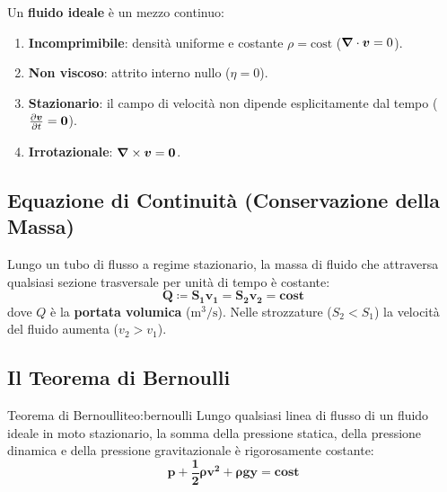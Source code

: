 Un \textbf{fluido ideale} è un mezzo continuo:
\begin{enumerate}
    \item \textbf{Incomprimibile}: densità uniforme e costante $\rho = \text{cost}$ ($\bm{\nabla}\cdot\bm{v} = 0$).
    \item \textbf{Non viscoso}: attrito interno nullo ($\eta = 0$).
    \item \textbf{Stazionario}: il campo di velocità non dipende esplicitamente dal tempo ($\frac{\partial \bm{v}}{\partial t} = \bm{0}$).
    \item \textbf{Irrotazionale}: $\bm{\nabla}\times\bm{v} = \bm{0}$.
\end{enumerate}

\subsection{Equazione di Continuità (Conservazione della Massa)}
Lungo un tubo di flusso a regime stazionario, la massa di fluido che attraversa qualsiasi sezione trasversale per unità di tempo è costante:
\begin{equation}
    \mathbf{Q \coloneqq S_1 v_1 = S_2 v_2 = \text{cost}}
    \label{eq:continuita}
\end{equation}
dove $Q$ è la \textbf{portata volumica} ($\si{\metre\cubed\per\second}$). Nelle strozzature ($S_2 < S_1$) la velocità del fluido aumenta ($v_2 > v_1$).

\subsection{Il Teorema di Bernoulli}

\begin{teorema}{Teorema di Bernoulli}{teo:bernoulli}
Lungo qualsiasi linea di flusso di un fluido ideale in moto stazionario, la somma della pressione statica, della pressione dinamica e della pressione gravitazionale è rigorosamente costante:
\begin{equation}
    \mathbf{p + \frac{1}{2}\rho v^2 + \rho g y = \text{cost}}
    \label{eq:bernoulli}
\end{equation}
\end{teorema}

